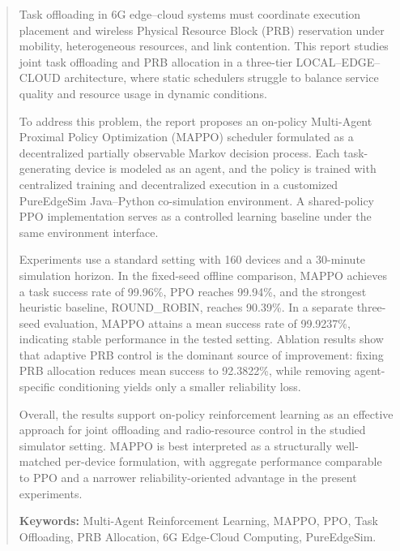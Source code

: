 \newpage
{}
\renewcommand{\abstractname}{\Large Abstract}
\begin{abstract}

Task offloading in 6G edge--cloud systems must coordinate execution placement and wireless Physical Resource Block (PRB) reservation under mobility, heterogeneous resources, and link contention. This report studies joint task offloading and PRB allocation in a three-tier LOCAL--EDGE--CLOUD architecture, where static schedulers struggle to balance service quality and resource usage in dynamic conditions.

To address this problem, the report proposes an on-policy Multi-Agent Proximal Policy Optimization (MAPPO) scheduler formulated as a decentralized partially observable Markov decision process. Each task-generating device is modeled as an agent, and the policy is trained with centralized training and decentralized execution in a customized PureEdgeSim Java--Python co-simulation environment. A shared-policy PPO implementation serves as a controlled learning baseline under the same environment interface.

Experiments use a standard setting with 160 devices and a 30-minute simulation horizon. In the fixed-seed offline comparison, MAPPO achieves a task success rate of 99.96\%, PPO reaches 99.94\%, and the strongest heuristic baseline, ROUND\_ROBIN, reaches 90.39\%. In a separate three-seed evaluation, MAPPO attains a mean success rate of 99.9237\%, indicating stable performance in the tested setting. Ablation results show that adaptive PRB control is the dominant source of improvement: fixing PRB allocation reduces mean success to 92.3822\%, while removing agent-specific conditioning yields only a smaller reliability loss.

Overall, the results support on-policy reinforcement learning as an effective approach for joint offloading and radio-resource control in the studied simulator setting. MAPPO is best interpreted as a structurally well-matched per-device formulation, with aggregate performance comparable to PPO and a narrower reliability-oriented advantage in the present experiments.


\vspace{1em}

\textbf{Keywords:} Multi-Agent Reinforcement Learning, MAPPO, PPO, Task Offloading, PRB Allocation, 6G Edge-Cloud Computing, PureEdgeSim.

\end{abstract}
